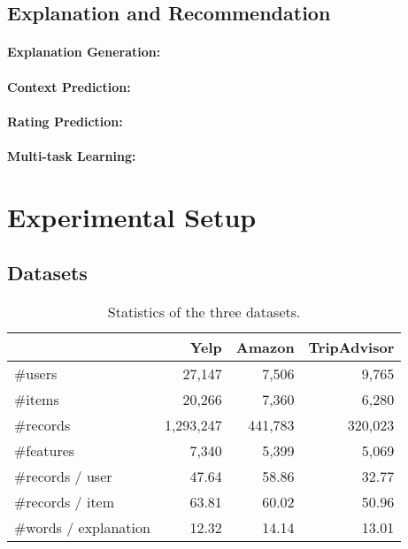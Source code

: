 \subsection{Explanation and Recommendation}


\paragraph{Explanation Generation:}


\paragraph{Context Prediction:}


\paragraph{Rating Prediction:}


\paragraph{Multi-task Learning:}


\section{Experimental Setup}


\subsection{Datasets}

\begin{table}
	\caption{Statistics of the three datasets.}
	\begin{center}	
		\begin{tabular}{l|r|r|r}
			\hline
			& Yelp & Amazon & TripAdvisor \\
			\hline
			\#users & 27,147 & 7,506 & 9,765 \\
			\#items & 20,266 & 7,360 & 6,280 \\
			\#records & 1,293,247 & 441,783 & 320,023 \\
			\#features & 7,340 & 5,399 & 5,069 \\
			\#records / user & 47.64 &58.86&32.77 \\
			\#records / item & 63.81 &60.02&50.96 \\
			\#words / explanation & 12.32 &14.14&13.01 \\
			\hline
		\end{tabular}
	\end{center}	
	\label{table3:dataset}
\end{table}

